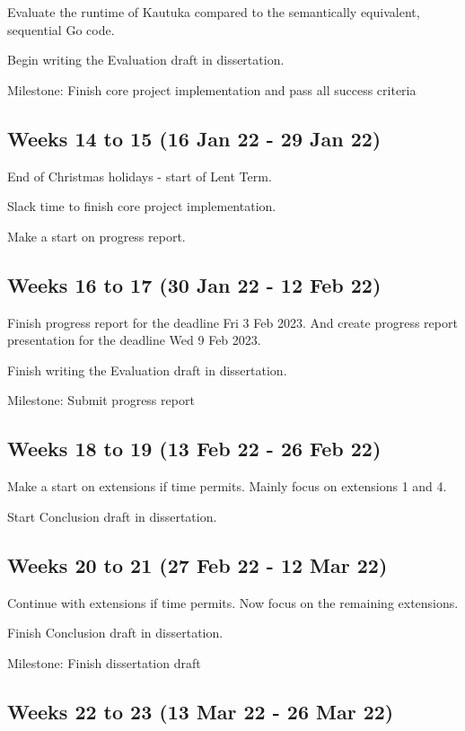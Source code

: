 \begin{refsection}
  Evaluate the runtime of Kautuka compared to the semantically equivalent, sequential Go code.

  Begin writing the Evaluation draft in dissertation.

  Milestone: Finish core project implementation and pass all success criteria  

  \subsection*{Weeks 14 to 15 (16 Jan 22 - 29 Jan 22)}
  End of Christmas holidays - start of Lent Term.

  Slack time to finish core project implementation.

  Make a start on progress report.

  \subsection*{Weeks 16 to 17 (30 Jan 22 - 12 Feb 22)}

  Finish progress report for the deadline Fri 3 Feb 2023. And create progress report presentation for the deadline Wed 9 Feb 2023.

  Finish writing the Evaluation draft in dissertation.

  Milestone: Submit progress report 

  \subsection*{Weeks 18 to 19 (13 Feb 22 - 26 Feb 22)}

  Make a start on extensions if time permits. Mainly focus on extensions 1 and 4.

  Start Conclusion draft in dissertation.

  \subsection*{Weeks 20 to 21 (27 Feb 22 - 12 Mar 22)}

  Continue with extensions if time permits. Now focus on the remaining extensions.

  Finish Conclusion draft in dissertation.

  Milestone: Finish dissertation draft

  \subsection*{Weeks 22 to 23 (13 Mar 22 - 26 Mar 22)}


\end{refsection}

